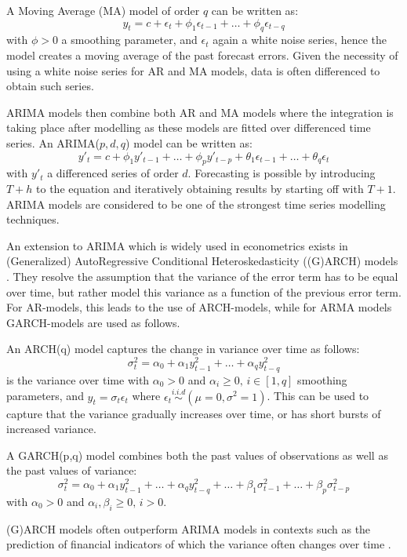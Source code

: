 A Moving Average (MA) model of order $q$ can be written as:
\[y_t=c+\epsilon_t + \phi_1\epsilon_{t-1}+\dots + \phi_q\epsilon_{t-q}\]
with $\phi>0$ a smoothing parameter, and $\epsilon_t$ again a white noise series, hence the model creates a moving average of the past forecast errors.
Given the necessity of using a white noise series for AR and MA models, data is often differenced to obtain such series.

ARIMA models then combine both AR and MA models where the integration is taking place after modelling as these models are fitted over differenced time series. 
An ARIMA($p,d,q$) model can be written as:
\[y'_t=c + \phi_1 y'_{t-1} + \dots + \phi_p y'_{t-p} + \theta_1 \epsilon_{t-1} + \dots + \theta_q \epsilon_t\]
with $y'_t$ a differenced series of order $d$.
Forecasting is possible by introducing $T+h$ to the equation and iteratively obtaining results by starting off with $T+1$.
ARIMA models are considered to be one of the strongest time series modelling techniques.

An extension to ARIMA which is widely used in econometrics exists in (Generalized) AutoRegressive Conditional Heteroskedasticity ((G)ARCH) models \cite{francq2019garch}.
They resolve the assumption that the variance of the error term has to be equal over time, but rather model this variance as a function of the previous error term.
For AR-models, this leads to the use of ARCH-models, while for ARMA models GARCH-models are used as follows.

An ARCH(q) model captures the change in variance over time as follows:
\[\sigma^2_t = \alpha_0 + \alpha_1 y^2_{t-1} + \dots + \alpha_q y^2_{t-q}\] is the variance over time
with $\alpha_0 > 0$ and $\alpha_i\geq 0,\,i\in[1,q]$ smoothing parameters, and $y_t=\sigma_t\epsilon_t$ where $\epsilon_t \overset{i.i.d}{\sim} (\mu=0, \sigma^2=1)$.
This can be used to capture that the variance  gradually increases over time, or has short bursts of increased variance.

A GARCH(p,q) model combines both the past values of observations as well as the past values of variance:
\[\sigma^2_t = \alpha_0 + \alpha_1 y^2_{t-1} + \dots + \alpha_q y^2_{t-q} + \dots + \beta_1\sigma^2_{t-1} + \dots + \beta_p\sigma^2_{t-p}\]
with $\alpha_0 > 0$ and $\alpha_i,\beta_i\geq 0,\,i>0$.

(G)ARCH models often outperform ARIMA models in contexts such as the prediction of financial indicators of which the variance often changes over time \cite{francq2019garch}.


